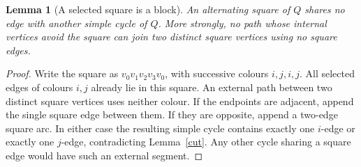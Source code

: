 \documentclass[11pt,a4paper]{article}
\newtheorem{lemma}[theorem]{Lemma}
\begin{document}
\begin{lemma}[A selected square is a block]\label{squareblock}
An alternating square of $Q$ shares no edge with another simple cycle
of $Q$. More strongly, no path whose internal vertices avoid the square
can join two distinct square vertices using no square edges.
\end{lemma}
\begin{proof}
Write the square as $v_0v_1v_2v_3v_0$, with successive colours $i,j,i,j$.
All selected edges of colours $i,j$ already lie in this square. An
external path between two distinct square vertices uses neither colour.
If the endpoints are adjacent, append the single square edge between
them. If they are opposite, append a two-edge square arc. In either
case the resulting simple cycle contains exactly one $i$-edge or
exactly one $j$-edge, contradicting Lemma~\ref{cut}. Any other cycle
sharing a square edge would have such an external segment.
\end{proof}
\end{document}

